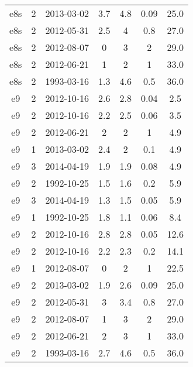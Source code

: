 \begin{table*}[htp]
\begin{tabular}{ccccccc}
e8s & 2 & 2013-03-02 & 3.7 & 4.8 & 0.09 & 25.0 \\
e8s & 2 & 2012-05-31 & 2.5 & 4 & 0.8 & 27.0 \\
e8s & 2 & 2012-08-07 & 0 & 3 & 2 & 29.0 \\
e8s & 2 & 2012-06-21 & 1 & 2 & 1 & 33.0 \\
e8s & 2 & 1993-03-16 & 1.3 & 4.6 & 0.5 & 36.0 \\
e9 & 2 & 2012-10-16 & 2.6 & 2.8 & 0.04 & 2.5 \\
e9 & 2 & 2012-10-16 & 2.2 & 2.5 & 0.06 & 3.5 \\
e9 & 2 & 2012-06-21 & 2 & 2 & 1 & 4.9 \\
e9 & 1 & 2013-03-02 & 2.4 & 2 & 0.1 & 4.9 \\
e9 & 3 & 2014-04-19 & 1.9 & 1.9 & 0.08 & 4.9 \\
e9 & 2 & 1992-10-25 & 1.5 & 1.6 & 0.2 & 5.9 \\
e9 & 3 & 2014-04-19 & 1.3 & 1.5 & 0.05 & 5.9 \\
e9 & 1 & 1992-10-25 & 1.8 & 1.1 & 0.06 & 8.4 \\
e9 & 2 & 2012-10-16 & 2.8 & 2.8 & 0.05 & 12.6 \\
e9 & 2 & 2012-10-16 & 2.2 & 2.3 & 0.2 & 14.1 \\
e9 & 1 & 2012-08-07 & 0 & 2 & 1 & 22.5 \\
e9 & 2 & 2013-03-02 & 1.9 & 2.6 & 0.09 & 25.0 \\
e9 & 2 & 2012-05-31 & 3 & 3.4 & 0.8 & 27.0 \\
e9 & 2 & 2012-08-07 & 1 & 3 & 2 & 29.0 \\
e9 & 2 & 2012-06-21 & 2 & 3 & 1 & 33.0 \\
e9 & 2 & 1993-03-16 & 2.7 & 4.6 & 0.5 & 36.0 \\
\hline
\end{tabular}

\end{table*}

